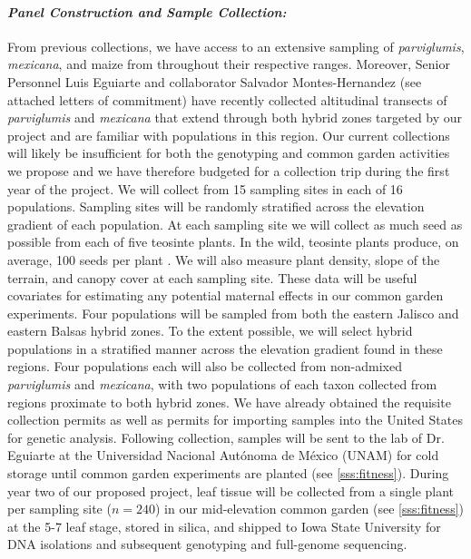 \paragraph{\emph{Panel Construction and Sample Collection:}}
From previous collections, we have access to an extensive sampling of \emph{parviglumis}, \emph{mexicana}, and maize from throughout their respective ranges.  Moreover, Senior Personnel Luis Eguiarte and collaborator Salvador Montes-Hernandez (see attached letters of commitment) have recently collected altitudinal transects of \emph{parviglumis} and \emph{mexicana} that extend through both hybrid zones targeted by our project \citep{Diez2013} and are  familiar with populations in this region.  Our current collections will likely be insufficient for both the genotyping and common garden activities we propose  and we have therefore budgeted for a collection trip during the first year of the project.  We will collect from 15 sampling sites in each of 16 populations.  Sampling sites will be randomly stratified across the elevation gradient of each population.  At each sampling site we will collect as much seed as possible from each of five teosinte plants.  In the wild, teosinte plants produce, on average, 100 seeds per plant \citep{wilkes1967teosinte}.  We will also measure plant density, slope of the terrain, and canopy cover at each sampling site.  These data will be useful covariates for estimating any potential maternal effects in our common garden experiments.  Four populations will be sampled from both the eastern Jalisco and eastern Balsas hybrid zones.  To the extent possible, we will select hybrid populations in a stratified manner across the elevation gradient found in these regions. Four populations each will also be collected from non-admixed \emph{parviglumis} and \emph{mexicana}, with two populations of each taxon collected from regions proximate to both hybrid zones.  We have already obtained the requisite collection permits as well as permits for importing samples into the United States for genetic analysis. Following collection, samples will be sent to the lab of Dr. Eguiarte at the Universidad Nacional Aut\'{o}noma de M\'{e}xico (UNAM) for cold storage until common garden experiments are planted (see \ref{sss:fitness}).  During year two of our proposed project, leaf tissue will be collected from a single plant per sampling site ($n=240$) in our mid-elevation common garden (see \ref{sss:fitness}) at the 5-7 leaf stage, stored in silica, and shipped to Iowa State University for DNA isolations and subsequent genotyping and full-genome sequencing.

